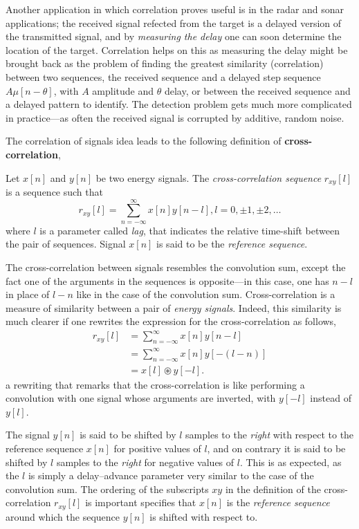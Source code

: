 \documentclass[\documentfontsize, twocolumn]{\classname}
\begin{document}
Another application in which correlation proves useful is in the radar and sonar applications; the received signal refected from the target is a delayed version of the transmitted signal, and by \emph{measuring the delay} one can soon determine the location of the target. Correlation helps on this as measuring the delay might be brought back as the problem of finding the greatest similarity (correlation) between two sequences, the received sequence and a delayed step sequence $A\mu[n-\theta]$, with $A$ amplitude and $\theta$ delay, or between the received sequence and a delayed pattern to identify. The detection problem gets much more complicated in practice---as often the received signal is corrupted by additive, random noise.

The correlation of signals idea leads to the following definition of \textbf{cross-correlation},
\begin{defin}
    Let $x[n]$ and $y[n]$ be two energy signals. The \emph{cross-correlation sequence} $r_{xy}[l]$ is a sequence such that
    \begin{equation}\label{eqn:crossCorrelation}
        r_{xy}[l] = \sum_{n=-\infty}^\infty x[n]y[n-l], l = 0, \pm 1, \pm 2, \dots
    \end{equation}
    where $l$ is a parameter called \emph{lag}, that indicates the relative time-shift between the pair of sequences. Signal $x[n]$ is said to be the \emph{reference sequence}.
\end{defin}

The cross-correlation between signals resembles the convolution sum, except the fact one of the arguments in the sequences is opposite---in this case, one has $n-l$ in place of $l - n$ like in the case of the convolution sum. Cross-correlation is a measure of similarity between a pair of \emph{energy signals}. Indeed, this similarity is much clearer if one rewrites the expression for the cross-correlation as follows,
\begin{align*}
    r_{xy}[l] &= \sum_{n=-\infty}^\infty x[n]y[n-l]\\
              &= \sum_{n=-\infty}^\infty x[n]y[-(l-n)]\\
              &= x[l] \circledast y[-l].
\end{align*}
a rewriting that remarks that the cross-correlation is like performing a convolution with one signal whose arguments are inverted, with $y[-l]$ instead of $y[l]$.


The signal $y[n]$ is said to be shifted by $l$ samples to the \emph{right} with respect to the reference sequence $x[n]$ for positive values of $l$, and on contrary it is said to be shifted by $l$ samples to the \emph{right} for negative values of $l$. This is as expected, as the $l$ is simply a delay--advance parameter very similar to the case of the convolution sum. The ordering of the subscripts $xy$ in the definition of the cross-correlation $r_{xy}[l]$ is important specifies that $x[n]$ is the \emph{reference sequence} around which the sequence $y[n]$ is shifted with respect to.
\end{document}
